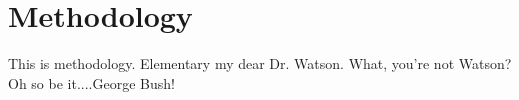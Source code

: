 \chapter{Methodology}
This is methodology. 
Elementary my dear Dr. Watson. 
What, you're not Watson?
Oh so be it....George Bush!